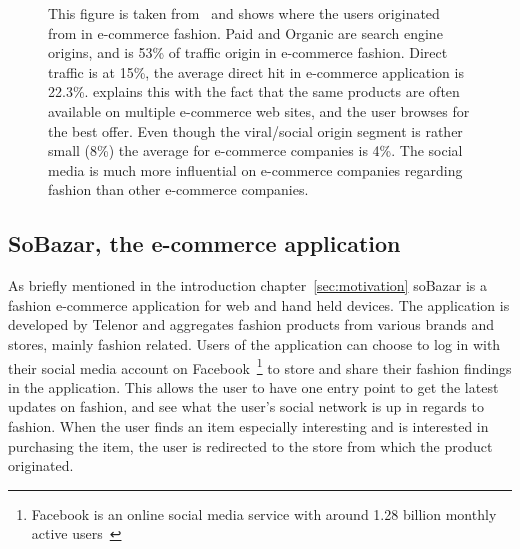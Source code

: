   \begin{figure}[H]
    \caption[Traffic Sources In Fashion]{This figure is taken from~\cite{Jorij2012} and shows where the users originated from in e-commerce fashion.
    Paid and Organic are search engine origins, and is 53\% of traffic origin in e-commerce fashion.
    Direct traffic is at 15\%, the average direct hit in e-commerce application is 22.3\%.
    \cite{Jorij2012} explains this with the fact that the same products are often available on multiple e-commerce web sites, and the user browses for the best offer.
    Even though the viral/social origin segment is rather small (8\%) the average for e-commerce companies is 4\%.
    The social media is much more influential on e-commerce companies regarding fashion than other e-commerce companies.}
  \end{figure}


\subsection{SoBazar, the e-commerce application}
  As briefly mentioned in the introduction chapter~\ref{sec:motivation} soBazar is a fashion e-commerce application for web and hand held devices.
  The application is developed by Telenor and aggregates fashion products from various brands and stores, mainly fashion related.
  Users of the application can choose to log in with their social media account on Facebook~\footnote{Facebook is an online social media service with around 1.28 billion monthly active users~\cite{facebook}} to store and share their fashion findings in the application.
  This allows the user to have one entry point to get the latest updates on fashion, and see what the user's social network is up in regards to fashion.
  When the user finds an item especially interesting and is interested in purchasing the item, the user is redirected to the store from which the product originated.

